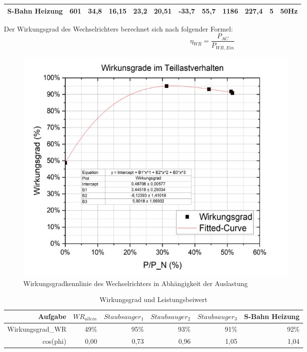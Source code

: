 \begin{table}[!ht]
\begin{tabularx}{\linewidth}{|r|X|X|X|X|X|X|X|X|X|X|X|}
\rowcolor[HTML]{FFFFFF} 
\cellcolor[HTML]{CFE5A8}S-Bahn Heizung & 601                             & 34,8                          & 16,15                         & 23,2                         & 20,51                        & -33,7                          & 55,7                         & 1186                         & 227,4                        & 5                            & 50Hz                    \\ \hline
\end{tabularx}
	\label{tab:230512_Messtabelle}
\end{table}

Der Wirkungsgrad des Wechselrichters berechnet sich nach folgender Formel:
%
\begin{equation}
	\eta_{ WR} = \frac{ P_{AC} }{ P_{WR,Ein} }
	\label{eq:230509_Wirkungsgrad}
\end{equation}
%
%
\begin{figure}[!ht]
		\centering
		\includegraphics[width=0.7\textwidth]{Abbildungen/Kennlinie wr}
		\caption{Wirkungsgradkennlinie des Wechselrichters in Abhängigkeit der Auslastung}
		\label{fig:230512_WRkennlinie}
\end{figure}
%
\begin{table}[]
 \caption{Wirkungsgrad und Leistungsbeiwert}
	\centering
\begin{tabular}{|r|r|r|r|r|r|}
\hline
\rowcolor[HTML]{76B900} 
Aufgabe                                  & $WR_{allein}$ & $Staubsauger_1$ & $Staubsauger_2$ & $Staubsauger_3$ & S-Bahn Heizung \\ \hline
\cellcolor[HTML]{cfe5a8}Wirkungsgrad\_WR & 49\%       & 95\%     & 93\%     & 91\%     & 92\%            \\ \hline
\cellcolor[HTML]{cfe5a8}cos(phi)         & 0,00       & 0,73     & 0,96     & 1,05     & 1,04            \\ \hline
\end{tabular}
\end{table}
